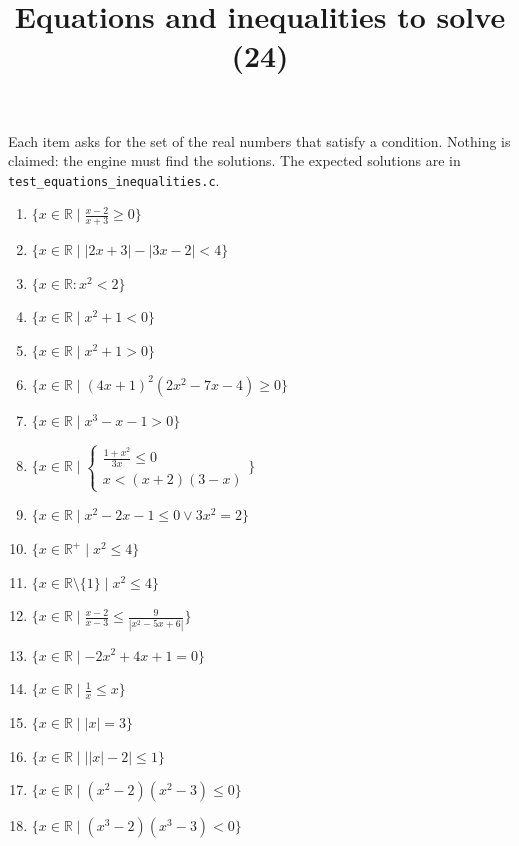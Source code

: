 \documentclass[11pt,a4paper]{article}
\title{Equations and inequalities to solve (24)}
\author{}
\date{}
\begin{document}
\maketitle
Each item asks for the set of the real numbers that satisfy a condition. Nothing is claimed: the engine must find the solutions. The expected solutions are in \texttt{test\_equations\_inequalities.c}.

\begin{enumerate}
\item $\displaystyle \{x \in \mathbb{R} \mid \frac{x - 2}{x + 3} \ge 0\}$
\item $\displaystyle \{x \in \mathbb{R} \mid \left|2x + 3\right| - \left|3x - 2\right| < 4\}$
\item $\displaystyle \{x \in \mathbb{R} : x^{2} < 2\}$
\item $\displaystyle \{x \in \mathbb{R} \mid x^{2} + 1 < 0\}$
\item $\displaystyle \{x \in \mathbb{R} \mid x^{2} + 1 > 0\}$
\item $\displaystyle \{x \in \mathbb{R} \mid (4x + 1)^{2}(2x^{2} - 7x - 4) \ge 0\}$
\item $\displaystyle \{x \in \mathbb{R} \mid x^{3} - x - 1 > 0\}$
\item $\displaystyle \{x \in \mathbb{R} \mid \begin{cases} \frac{1 + x^{2}}{3x} \le 0 \\ x < (x + 2)(3 - x) \end{cases}\}$
\item $\displaystyle \{x \in \mathbb{R} \mid x^{2} - 2x - 1 \le 0 \lor 3x^{2} = 2\}$
\item $\displaystyle \{x \in \mathbb{R}^{+} \mid x^{2} \le 4\}$
\item $\displaystyle \{x \in \mathbb{R} \setminus \{1\} \mid x^{2} \le 4\}$
\item $\displaystyle \{x \in \mathbb{R} \mid \frac{x - 2}{x - 3} \le \frac{9}{\left|x^{2} - 5x + 6\right|}\}$
\item $\displaystyle \{x \in \mathbb{R} \mid -2x^{2} + 4x + 1 = 0\}$
\item $\displaystyle \{x \in \mathbb{R} \mid \frac{1}{x} \le x\}$
\item $\displaystyle \{x \in \mathbb{R} \mid \left|x\right| = 3\}$
\item $\displaystyle \{x \in \mathbb{R} \mid \left|\left|x\right| - 2\right| \le 1\}$
\item $\displaystyle \{x \in \mathbb{R} \mid (x^{2} - 2)(x^{2} - 3) \le 0\}$
\item $\displaystyle \{x \in \mathbb{R} \mid (x^{3} - 2)(x^{3} - 3) < 0\}$

\end{enumerate}
\end{document}
